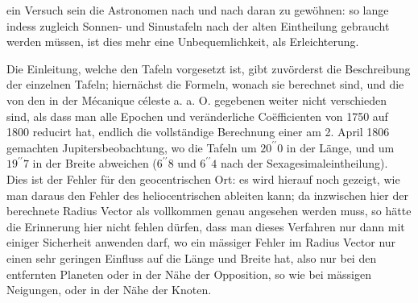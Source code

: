 ein Versuch sein die Astronomen nach und nach daran zu gewöhnen: so lange indess zugleich Sonnen- und Sinustafeln nach der alten Eintheilung gebraucht werden müssen, ist dies mehr eine Unbequemlichkeit, als Erleichterung.

Die Einleitung, welche den Tafeln vorgesetzt ist, gibt zuvörderst die Beschreibung der einzelnen Tafeln; hiernächst die Formeln, wonach sie berechnet sind, und die von den in der Mécanique céleste a. a. O. gegebenen weiter nicht verschieden sind, als dass man alle Epochen und veränderliche Coëfficienten von 1750 auf 1800 reducirt hat, endlich die vollständige Berechnung einer am 2. April 1806 gemachten Jupitersbeobachtung, wo die Tafeln um $20^{\prime\prime}0$ in der Länge, und um $19^{\prime\prime}7$ in der Breite abweichen ($6^{\prime\prime}8$ und $6^{\prime\prime}4$ nach der Sexagesimaleintheilung). Dies ist der Fehler für den geocentrischen Ort: es wird hierauf noch gezeigt, wie man daraus den Fehler des heliocentrischen ableiten kann; da inzwischen hier der berechnete Radius Vector als vollkommen genau angesehen werden muss, so hätte die Erinnerung hier nicht fehlen dürfen, dass man dieses Verfahren nur dann mit einiger Sicherheit anwenden darf, wo ein mässiger Fehler im Radius Vector nur einen sehr geringen Einfluss auf die Länge und Breite hat, also nur bei den entfernten Planeten oder in der Nähe der Opposition, so wie bei mässigen Neigungen, oder in der Nähe der Knoten.

